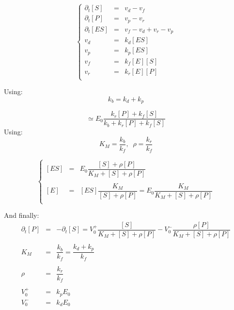 \documentclass[aps,12pt]{revtex4}
\begin{document}
\begin{equation}
\left\lbrace
\begin{array}{ccl}
\partial_t [S]  & = & v_d - v_f\\
\partial_t [P]  & = & v_p - v_r \\
\partial_t [ES] & = & v_f - v_d + v_r - v_p\\
v_d & = & k_d [ES]\\ 
v_p & = & k_p [ES]\\
v_f & = & k_f [E][S]\\
v_r & = & k_r [E][P]\\
\end{array}
\right.
\end{equation}

Using:
\begin{equation}
k_b = k_d + k_p
\end{equation}

\begin{equation}
[ES] \simeq E_0 \dfrac{k_r [P] + k_f [S]}{k_b + k_r [P] + k_f [S] }
\end{equation}
Using:
\begin{equation}
K_M = \dfrac{k_b}{k_f}, \;\; \rho = \dfrac{k_r}{k_f}
\end{equation}

\begin{equation}
\left\lbrace
\begin{array}{ccl}
	{[ES]} & = & E_0 \dfrac{[S] + \rho [P]}{K_M + [S] + \rho [P]}\\
	\\
	{[E]}  & = & [ES] \dfrac{K_M}{[S] + \rho [P]} = E_0 \dfrac{K_M}{K_M + [S] + \rho [P]}\\
\end{array}
\right.
\end{equation}

And finally:
\begin{equation}
\boxed{
\begin{array}{rcl}
	\partial_t [P]  & = & - \partial_t [S] = V_0^+ \dfrac{[S]}{K_M + [S] + \rho [P]} - V_0^-\dfrac{\rho [P]}{K_M + [S] + \rho [P]}\\
	\\
	K_M & = & \dfrac{k_b}{k_f} = \dfrac{k_d+k_p}{k_f}\\
	\\
	\rho & = & \dfrac{k_r}{k_f}\\
	\\
	 V_0^+ & = & k_p E_0\\
	 V_0^- & = & k_d E_0\\
\end{array}
}
\end{equation}
\end{document}
